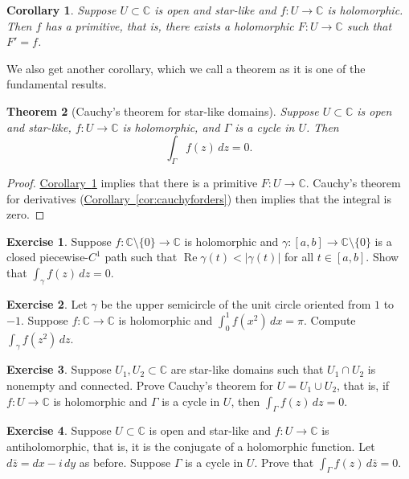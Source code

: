 \documentclass[12pt,openany]{book}
\renewcommand{\Re}{\operatorname{Re}}
\newcommand{\sabs}[1]{\lvert {#1} \rvert}
\newcommand{\C}{{\mathbb{C}}}
\theoremstyle{plain}
\newtheorem{thm}{Theorem}[section]
\newtheorem{cor}[thm]{Corollary}
\theoremstyle{remark}
\theoremstyle{definition}
\newenvironment{exbox}{%
    \def\FrameCommand{\vrule width 1pt \relax\hspace{10pt}}%
    \MakeFramed{\advance\hsize-\width\FrameRestore}%
}{%
    \endMakeFramed
}
\theoremstyle{exercise}
\newtheorem{exercise}{Exercise}[section]
\theoremstyle{example}
\newcommand{\corref}[1]{\hyperref[#1]{Corollary~\ref*{#1}}}
\begin{document}
\begin{cor} \label{cor:primitiveinstarlike}
Suppose $U \subset \C$ is open and star-like
and $f \colon U \to \C$ is holomorphic.
Then $f$ has a primitive, that is,
there exists a holomorphic $F \colon U \to \C$
such that $F' = f$.
\end{cor}

We also get another corollary, which we call
a theorem as it is one of the fundamental results.

\begin{thm}[Cauchy's theorem for star-like domains]
%
Suppose $U \subset \C$ is open and star-like, $f \colon U \to \C$ is holomorphic,
and $\Gamma$ is
a cycle
in $U$.  Then
\begin{equation*}
\int_{\Gamma} f(z) \, dz = 0 .
\end{equation*}
\end{thm}

\begin{proof}
\corref{cor:primitiveinstarlike} implies that there is
a primitive $F \colon U \to \C$.
Cauchy's theorem for derivatives (\corref{cor:cauchyforders}) then implies that the integral is zero.
\end{proof}

\begin{exbox}
\begin{exercise}
Suppose $f \colon \C \setminus \{ 0 \} \to \C$ is holomorphic
and
$\gamma \colon [a,b] \to \C \setminus \{ 0 \}$ is a closed piecewise-$C^1$ path
such that $\Re \gamma(t) < \sabs{\gamma(t)}$ for all $t \in [a,b]$.
Show that $\int_\gamma f(z) \, dz = 0$.
\end{exercise}

\begin{exercise}
Let $\gamma$ be the upper semicircle of the unit circle oriented from $1$ to
$-1$.   Suppose $f \colon \C \to \C$ is holomorphic
and $\int_0^1 f(x^2) \, dx = \pi$.
Compute $\int_\gamma f(z^2) \, dz$.
\end{exercise}

\begin{exercise}
Suppose $U_1, U_2 \subset \C$ are star-like domains such that $U_1 \cap U_2$
is nonempty and connected.  Prove Cauchy's theorem for $U = U_1 \cup U_2$, that is,
if $f \colon U \to \C$ is holomorphic and $\Gamma$ is a cycle in $U$,
then $\int_\Gamma f(z) \, dz = 0$.
\end{exercise}

\begin{exercise}
Suppose $U \subset \C$ is open and star-like and
$f \colon U \to \C$ is antiholomorphic, that is, it is the conjugate of a
holomorphic function.  Let $d\bar{z} = dx - i \, dy$ as before.  Suppose
$\Gamma$ is a cycle in $U$.  Prove that
$\int_\Gamma f(z) \, d\bar{z} = 0$.
\end{exercise}
\end{exbox}
\end{document}
